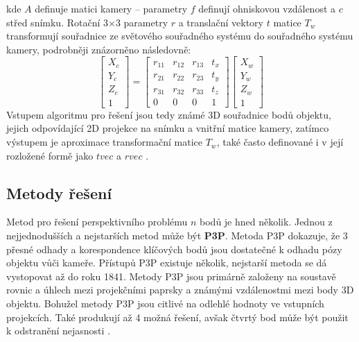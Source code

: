 kde $A$ definuje matici kamery -- parametry $f$ definují ohniskovou vzdálenost a $c$ střed snímku. Rotační 3$\times$3 parametry $r$ a translační vektory $t$ matice $T_w$ transformují souřadnice ze světového souřadného systému do souřadného systému kamery, podrobněji znázorněno následovně:
\begin{equation}
    \begin{bmatrix} X_c \\ Y_c \\ Z_c \\ 1 \end{bmatrix} = \begin{bmatrix} r_{11} & r_{12} & r_{13} & t_x \\ r_{21} & r_{22} & r_{23} & t_y \\ r_{31} & r_{32} & r_{33} & t_z \\ 0 & 0 & 0 & 1 \end{bmatrix} \begin{bmatrix} X_w \\ Y_w \\ Z_w \\ 1 \end{bmatrix}
\end{equation}
Vstupem algoritmu pro řešení jsou tedy známé 3D souřadnice bodů objektu, jejich odpovídající 2D projekce na snímku a vnitřní matice kamery, zatímco výstupem je aproximace transformační matice $T_w$, také často definované i v její rozložené formě jako $tvec$ a $rvec$ \cite{opencv_solvepnp}.
\subsection{Metody řešení}
Metod pro řešení perspektivního problému $n$ bodů je hned několik. Jednou z nejjednodušších a nejstarších metod může být \textbf{P3P}. Metoda P3P dokazuje, že 3 přesné odhady a korespondence klíčových bodů jsou dostatečné k odhadu pózy objektu vůči kameře. Přístupů P3P existuje několik, nejstarší metoda se dá vystopovat až do roku 1841. Metody P3P jsou primárně založeny na soustavě rovnic a úhlech mezi projekčními paprsky a známými vzdálenostmi mezi body 3D objektu. Bohužel metody P3P jsou citlivé na odlehlé hodnoty ve vstupních projekcích. Také produkují až 4 možná řešení, avšak čtvrtý bod může být použit k odstranění nejasnosti \cite{shrestha2019pnp}.

